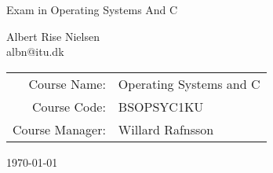 \begin{titlepage}
  \vspace*{\fill}

  \begin{center}
    {\Huge Exam in Operating Systems And C \par
    }

    \bigskip\bigskip%
    Albert Rise Nielsen\\
    albn@itu.dk


    \bigskip\bigskip\bigskip%
    \begin{tabular}{rl}
      Course Name:& Operating Systems and C\\
      Course Code:& BSOPSYC1KU\\
      Course Manager:& Willard Rafnsson
    \end{tabular}

    \bigskip\bigskip\bigskip\bigskip%
    \today
  \end{center}

  \vspace*{\fill}
\end{titlepage}